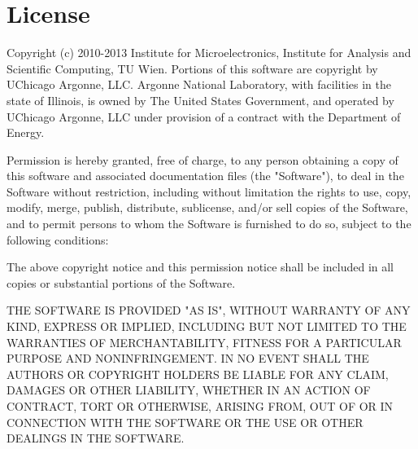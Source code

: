 
\chapter{License} %

Copyright (c) 2010-2013 Institute for Microelectronics, Institute for Analysis and Scientific Computing, TU Wien.
Portions of this software are copyright by UChicago Argonne, LLC.
Argonne National Laboratory, with facilities in the state of Illinois,
is owned by The United States Government, and operated by UChicago Argonne, LLC
under provision of a contract with the Department of Energy.

Permission is hereby granted, free of charge, to any person obtaining a copy
of this software and associated documentation files (the "Software"), to deal
in the Software without restriction, including without limitation the rights
to use, copy, modify, merge, publish, distribute, sublicense, and/or sell
copies of the Software, and to permit persons to whom the Software is
furnished to do so, subject to the following conditions:

The above copyright notice and this permission notice shall be included in
all copies or substantial portions of the Software.

THE SOFTWARE IS PROVIDED "AS IS", WITHOUT WARRANTY OF ANY KIND, EXPRESS OR
IMPLIED, INCLUDING BUT NOT LIMITED TO THE WARRANTIES OF MERCHANTABILITY,
FITNESS FOR A PARTICULAR PURPOSE AND NONINFRINGEMENT. IN NO EVENT SHALL THE
AUTHORS OR COPYRIGHT HOLDERS BE LIABLE FOR ANY CLAIM, DAMAGES OR OTHER
LIABILITY, WHETHER IN AN ACTION OF CONTRACT, TORT OR OTHERWISE, ARISING FROM,
OUT OF OR IN CONNECTION WITH THE SOFTWARE OR THE USE OR OTHER DEALINGS IN
THE SOFTWARE.